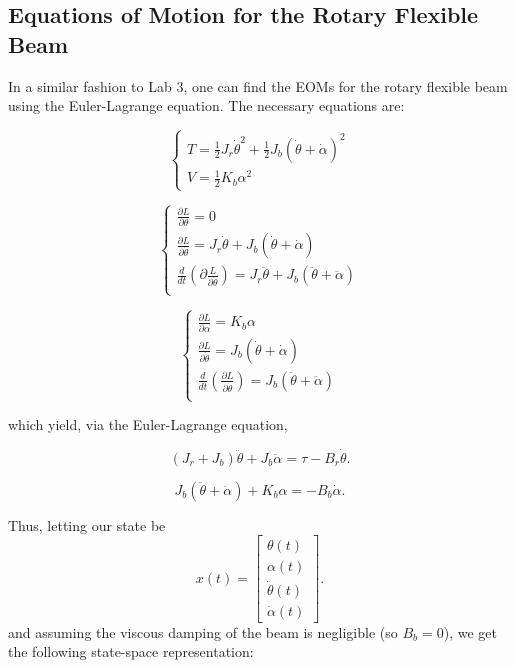 \subsection{Equations of Motion for the Rotary Flexible Beam}
In a similar fashion to Lab 3, one can find the EOMs for the rotary flexible beam using the Euler-Lagrange equation. The necessary equations are:

\begin{equation*}
    \begin{cases}
        T = \frac{1}{2}J_r \dot{\theta}^2 + \frac{1}{2} J_b \left(\dot{\theta}+\dot{\alpha}\right)^2 \\
        V = \frac{1}{2} K_b \alpha^2
    \end{cases}
\end{equation*}

\[
    \begin{cases}
        \frac{\partial L}{\partial \theta}=0                                                                                             \\
        \frac{\partial L}{\partial \dot{\theta}}=J_r\dot{\theta}+J_b\left(\dot{\theta}+\dot{\alpha}\right)                               \\
        \frac{d}{dt} \left(\partial \frac{L}{\partial \dot{\theta}}\right)= J_r\ddot{\theta}+J_b\left(\ddot{\theta}+\ddot{\alpha}\right) \\
    \end{cases}
\]

\[
    \begin{cases}
        \frac{\partial L}{\partial \alpha}=K_b\alpha                                                                    \\
        \frac{\partial L}{\partial \dot{\theta}}=J_b\left(\dot{\theta}+\dot{\alpha}\right)                              \\
        \frac{d}{dt} \left(\frac{\partial L}{\partial \dot{\theta}}\right)= J_b\left(\ddot{\theta}+\ddot{\alpha}\right) \\
    \end{cases}
\]

which yield, via the Euler-Lagrange equation,

\[
    \left(J_r + J_b\right)\ddot{\theta} + J_b \ddot{\alpha} = \tau - B_r \dot{\theta}.
\]

\[
    J_b \left(\ddot{\theta} + \ddot{\alpha}\right) + K_b \alpha = -B_b \dot{\alpha}.
\]

Thus, letting our state be
\[
    x(t) =
    \left[\begin{array}{c}
            \theta(t)       \\
            \alpha(t)       \\
            \dot{\theta}(t) \\
            \dot{\alpha}(t)
        \end{array}\right].
\]
and assuming the viscous damping of the beam is negligible (so $B_b = 0$), we get the following state-space representation:

